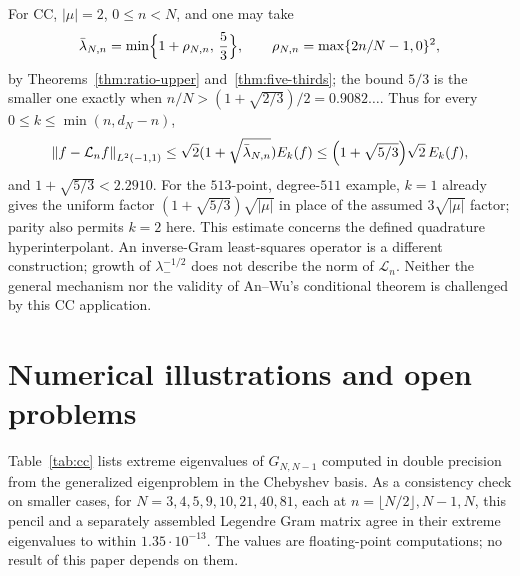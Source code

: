 \documentclass{siamart251216}
\newcommand{\norm}[1]{\left\lVert#1\right\rVert}
\begin{document}
For CC, $|\mu|=2$, $0\le n<N$, and one may take
\begin{equation}\label{eq:Bcc}
 \bar\lambda_{N,n}=\min\Bigl\{1+\rho_{N,n},\,\frac53\Bigr\},\qquad
 \rho_{N,n}=\max\{2n/N-1,0\}^2,
\end{equation}
by Theorems~\ref{thm:ratio-upper} and~\ref{thm:five-thirds}; the bound $5/3$
is the smaller one exactly when $n/N>(1+\sqrt{2/3})/2=0.9082\ldots$.
Thus for every $0\le k\le\min(n,d_N-n)$,
\begin{equation}\label{eq:CCerror}
 \norm{f-\mathcal L_nf}_{L^2(-1,1)}
 \le\sqrt2(1+\sqrt{\bar\lambda_{N,n}})E_k(f)
 \le\Bigl(1+\sqrt{5/3}\Bigr)\sqrt2\,E_k(f),
\end{equation}
and $1+\sqrt{5/3}<2.2910$.
For the $513$-point, degree-$511$ example, $k=1$ already gives the
uniform factor $(1+\sqrt{5/3})\sqrt{|\mu|}$ in place of the assumed
$3\sqrt{|\mu|}$ factor; parity also permits $k=2$ here.
This estimate concerns the defined quadrature hyperinterpolant. An
inverse-Gram least-squares operator is a different construction; growth
of $\lambda_-^{-1/2}$ does not describe the norm of $\mathcal L_n$.
Neither the general mechanism nor the validity of An--Wu's conditional
theorem is challenged by this CC application.

\section{Numerical illustrations and open problems}\label{sec:numerics}

Table~\ref{tab:cc} lists extreme eigenvalues of $G_{N,N-1}$ computed in
double precision from the generalized eigenproblem in the Chebyshev basis.
As a consistency check on smaller cases, for $N=3,4,5,9,10,21,40,81$, each at
$n=\lfloor N/2\rfloor,N-1,N$, this pencil and a separately assembled Legendre
Gram matrix agree in their extreme eigenvalues to within $1.35\cdot10^{-13}$.
The values are floating-point computations; no result of this paper depends
on them.
\end{document}
